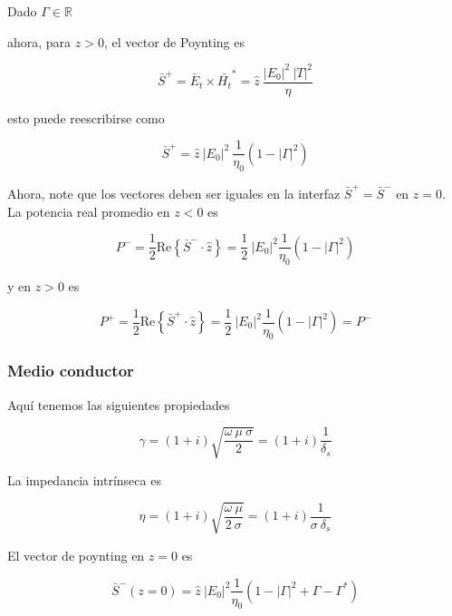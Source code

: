 Dado $\Gamma \in \mathbb{R}$

ahora, para $z >0$, el vector de Poynting es

\begin{equation*}
\bar{S}^{+} = \bar{E}_t \times \bar{H_t}^* = \hat{z} \ \frac{|E_0|^2 \ |T|^2}{\eta}
\end{equation*}

esto puede reescribirse como

\begin{equation*}
\bar{S}^{+} = \hat{z} \ |E_0|^2 \ \frac{1}{\eta_0} \left(1-|\Gamma|^2 \right)
\end{equation*}

Ahora, note que los vectores deben ser iguales en la interfaz $\bar{S}^{+} = \bar{S}^{-}$ en $z=0$. La potencia real promedio en $z<0$ es

\begin{equation*}
P^{-} = \frac{1}{2} \text{Re} \left\{  \bar{S}^- \cdot \hat{z} \right\} = \frac{1}{2} \ |E_0|^2 \frac{1}{\eta_0} \left(1-|\Gamma|^2 \right) 
\end{equation*}

y en $z>0$ es

\begin{equation*}
P^{+} = \frac{1}{2} \text{Re} \left\{  \bar{S}^+ \cdot \hat{z} \right\} = \frac{1}{2} \ |E_0|^2 \frac{1}{\eta_0} \left(1-|\Gamma|^2 \right) = P^{-}
\end{equation*}

\subsubsection*{Medio conductor}

Aquí tenemos las siguientes propiedades

\begin{equation*}
\gamma = (1+i)\sqrt{\frac{\omega \ \mu \ \sigma}{2}} = (1+i) \frac{1}{\delta_s}
\end{equation*}

La impedancia intrínseca es 

\begin{equation*}
\eta =  (1+i)\sqrt{\frac{\omega \ \mu }{2\ \sigma}} = (1+i) \frac{1}{\sigma \ \delta_s}
\end{equation*}

El vector de poynting en $z=0$ es

\begin{equation*}
\bar{S}^{-}(z=0) = \hat{z} \ |E_0|^2 \frac{1}{\eta_0} \left( 1 - |\Gamma|^2 + \Gamma - \Gamma^{*} \right)
\end{equation*}

